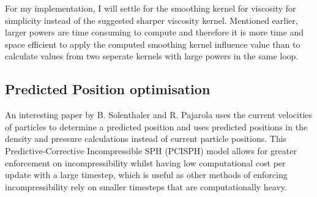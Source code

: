 \documentclass[write-up.tex]{subfiles}
\begin{document}
For my implementation, I will settle for the smoothing kernel for viscosity for simplicity instead of the suggested sharper viscosity kernel. Mentioned earlier, larger powers are time consuming to compute and therefore it is more time and space efficient to apply the computed smoothing kernel influence value than to calculate values from two seperate kernels with large powers in the same loop.

\subsection{Predicted Position optimisation}
An interesting paper by B. Solenthaler and R. Pajarola \cite{solenthaler} uses the current velocities of particles to determine a predicted position and uses predicted positions in the density and pressure calculations instead of current particle positions. This Predictive-Corrective Incompressible SPH (PCISPH) model allows for greater enforcement on incompressibility whilst having low computational cost per update with a large timestep, which is useful as other methods of enforcing incompressibility rely on smaller timesteps that are computationally heavy.
\end{document}
